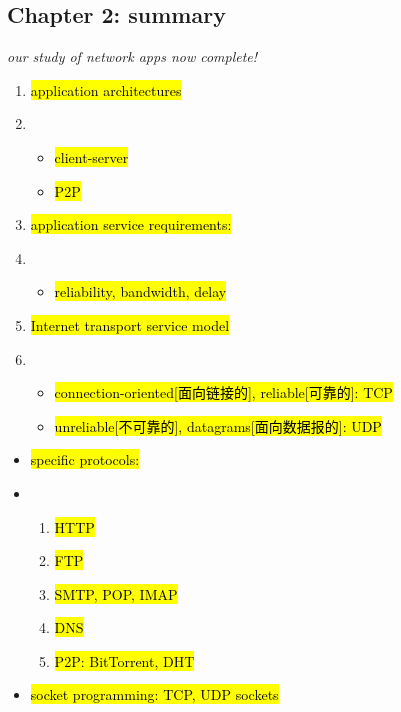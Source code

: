 \documentclass[
]{article}
\begin{document}
\hypertarget{chapter-2-summary}{%
\subsection{Chapter 2: summary}\label{chapter-2-summary}}

\emph{our study of network apps now complete!}

\begin{enumerate}
\def\labelenumi{\arabic{enumi}.}
\item
  \hl{application architectures}
\item
  \begin{itemize}
  \item
    \hl{client-server}
  \item
    \hl{P2P}
  \end{itemize}
\item
  \hl{application service requirements:}
\item
  \begin{itemize}
  \item
    \hl{reliability, bandwidth, delay}
  \end{itemize}
\item
  \hl{Internet transport service model}
\item
  \begin{itemize}
  \item
    \hl{connection-oriented{[}面向链接的{]}, reliable{[}可靠的{]}: TCP}
  \item
    \hl{unreliable{[}不可靠的{]}, datagrams{[}面向数据报的{]}: UDP}
  \end{itemize}
\end{enumerate}

\begin{itemize}
\item
  \hl{specific protocols:}
\item
  \begin{enumerate}
  \def\labelenumi{\arabic{enumi}.}
  \item
    \hl{HTTP}
  \item
    \hl{FTP}
  \item
    \hl{SMTP, POP, IMAP}
  \item
    \hl{DNS}
  \item
    \hl{P2P: BitTorrent, DHT}
  \end{enumerate}
\item
  \hl{socket programming: TCP, UDP sockets}
\end{itemize}
\end{document}

